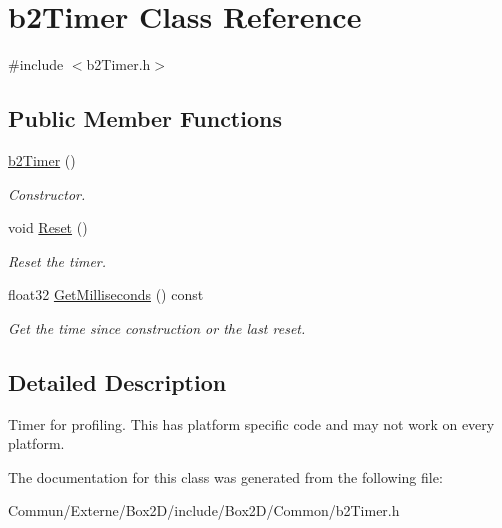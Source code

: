 \hypertarget{classb2_timer}{}\section{b2\+Timer Class Reference}
\label{classb2_timer}


{\ttfamily \#include $<$b2\+Timer.\+h$>$}

\subsection*{Public Member Functions}
\begin{DoxyCompactItemize}
\item 
\hyperlink{classb2_timer_afcc159032a8edeaa9febdf2b6cbd49a5}{b2\+Timer} ()\hypertarget{classb2_timer_afcc159032a8edeaa9febdf2b6cbd49a5}{}\label{classb2_timer_afcc159032a8edeaa9febdf2b6cbd49a5}

\begin{DoxyCompactList}\small\item\em Constructor. \end{DoxyCompactList}\item 
void \hyperlink{classb2_timer_a367388794588e9283600437be82f2889}{Reset} ()\hypertarget{classb2_timer_a367388794588e9283600437be82f2889}{}\label{classb2_timer_a367388794588e9283600437be82f2889}

\begin{DoxyCompactList}\small\item\em Reset the timer. \end{DoxyCompactList}\item 
float32 \hyperlink{classb2_timer_a354e020ec583a067b8f3b90a42a88e53}{Get\+Milliseconds} () const \hypertarget{classb2_timer_a354e020ec583a067b8f3b90a42a88e53}{}\label{classb2_timer_a354e020ec583a067b8f3b90a42a88e53}

\begin{DoxyCompactList}\small\item\em Get the time since construction or the last reset. \end{DoxyCompactList}\end{DoxyCompactItemize}


\subsection{Detailed Description}
Timer for profiling. This has platform specific code and may not work on every platform. 

The documentation for this class was generated from the following file\+:\begin{DoxyCompactItemize}
\item 
Commun/\+Externe/\+Box2\+D/include/\+Box2\+D/\+Common/b2\+Timer.\+h\end{DoxyCompactItemize}
